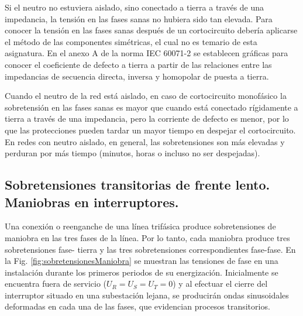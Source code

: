             Si el neutro no estuviera aislado, sino conectado a tierra a través de una impedancia, la tensión en las fases sanas no hubiera sido tan elevada. Para conocer la tensión en las fases sanas después de un cortocircuito debería aplicarse el método de las componentes simétricas, el cual no es temario de esta asignatura. En el anexo A de la norma IEC 60071-2 se establecen gráficas para conocer el coeficiente de defecto a tierra a partir de las relaciones entre las impedancias de secuencia directa, inversa y homopolar de puesta a tierra.\newline

            Cuando el neutro de la red está aislado, en caso de cortocircuito monofásico la sobretensión en las fases sanas es mayor que cuando está conectado rígidamente a tierra a través de una impedancia, pero la corriente de defecto es menor, por lo que las protecciones pueden tardar un mayor tiempo en despejar el cortocircuito. En redes con neutro aislado, en general, las sobretensiones son más elevadas y perduran por más tiempo (minutos, horas o incluso no ser despejadas).

        \subsection{Sobretensiones transitorias de frente lento. Maniobras en interruptores.} 
            Una conexión o reenganche de una línea trifásica produce sobretensiones de maniobra en las tres fases de la línea. Por lo tanto, cada maniobra produce tres sobretensiones fase- tierra y las tres sobretensiones correspondientes fase-fase. En la Fig. \ref{fig:sobretensionesManiobra} se muestran las tensiones de fase en una instalación durante los primeros periodos de su energización. Inicialmente se encuentra fuera de servicio ($U_\textit{R} = U_\textit{S} = U_\textit{T} = 0$) y al efectuar el cierre del interruptor situado en una subestación lejana, se producirán ondas sinusoidales deformadas en cada una de las fases, que evidencian procesos transitorios.\newline
            
